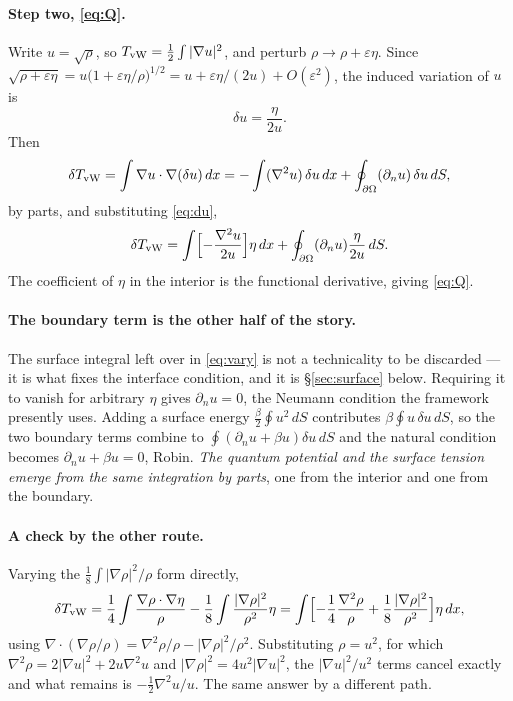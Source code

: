 \documentclass[11pt]{article}
\newcommand{\grad}{\nabla}
\newcommand{\half}{\tfrac12}
\begin{document}
\paragraph{Step two, \eqref{eq:Q}.} Write $u=\sqrt\rho$, so $T_{\rm vW}=\half\int|\grad u|^2$, and
perturb $\rho\to\rho+\varepsilon\eta$. Since
$\sqrt{\rho+\varepsilon\eta}=u\bigl(1+\varepsilon\eta/\rho\bigr)^{1/2}
=u+\varepsilon\eta/(2u)+O(\varepsilon^2)$, the induced variation of $u$ is
\begin{equation}\label{eq:du}
\delta u=\frac{\eta}{2u}.
\end{equation}
Then
\begin{equation}\label{eq:vary}
\delta T_{\rm vW}=\int\grad u\cdot\grad(\delta u)\,dx
=-\int(\grad^2u)\,\delta u\,dx+\oint_{\partial\Omega}(\partial_nu)\,\delta u\,dS ,
\end{equation}
by parts, and substituting \eqref{eq:du},
\[
\delta T_{\rm vW}=\int\Bigl[-\frac{\grad^2u}{2u}\Bigr]\eta\,dx
+\oint_{\partial\Omega}(\partial_nu)\frac{\eta}{2u}\,dS .
\]
The coefficient of $\eta$ in the interior is the functional derivative, giving \eqref{eq:Q}.

\paragraph{The boundary term is the other half of the story.} The surface integral left over in
\eqref{eq:vary} is not a technicality to be discarded --- it is what fixes the interface condition,
and it is \S\ref{sec:surface} below. Requiring it to vanish for arbitrary $\eta$ gives
$\partial_nu=0$, the Neumann condition the framework presently uses. Adding a surface energy
$\tfrac{\beta}{2}\oint u^2\,dS$ contributes $\beta\oint u\,\delta u\,dS$, so the two boundary terms
combine to $\oint(\partial_nu+\beta u)\delta u\,dS$ and the natural condition becomes
$\partial_nu+\beta u=0$, Robin. \emph{The quantum potential and the surface tension emerge from the
same integration by parts}, one from the interior and one from the boundary.

\paragraph{A check by the other route.} Varying the $\tfrac18\int|\grad\rho|^2/\rho$ form directly,
\[
\delta T_{\rm vW}=\frac14\int\frac{\grad\rho\cdot\grad\eta}{\rho}
-\frac18\int\frac{|\grad\rho|^2}{\rho^2}\eta
=\int\Bigl[-\frac14\frac{\grad^2\rho}{\rho}+\frac18\frac{|\grad\rho|^2}{\rho^2}\Bigr]\eta\,dx,
\]
using $\grad\!\cdot(\grad\rho/\rho)=\grad^2\rho/\rho-|\grad\rho|^2/\rho^2$. Substituting $\rho=u^2$,
for which $\grad^2\rho=2|\grad u|^2+2u\grad^2u$ and $|\grad\rho|^2=4u^2|\grad u|^2$, the
$|\grad u|^2/u^2$ terms cancel exactly and what remains is $-\tfrac12\grad^2u/u$. The same answer by
a different path.
\end{document}
